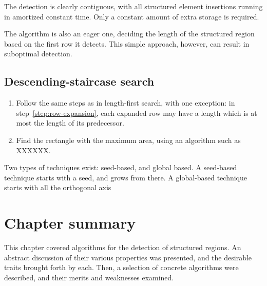 The detection is clearly contiguous, with all structured element insertions running in amortized constant time. Only a constant amount of extra storage is required.

The algorithm is also an eager one, deciding the length of the structured region based on the first row it detects. This simple approach, however, can result in suboptimal detection.



\subsection{Descending-staircase search}
\begin{enumerate}
\item Follow the same steps as in length-first search, with one exception: in step~\ref{step:row-expansion}, each expanded row may have a length which is at most the length of its predecessor.
\item Find the rectangle with the maximum area, using an algorithm such as XXXXXX.
\end{enumerate}



Two types of techniques exist: seed-based, and global based. A seed-based technique starts with a seed, and grows from there. A global-based technique starts with all the orthogonal axis

\section{Chapter summary}
This chapter covered algorithms for the detection of structured regions. An abstract discussion of their various properties was presented, and the desirable traits brought forth by each. Then, a selection of concrete algorithms were described, and their merits and weaknesses examined.